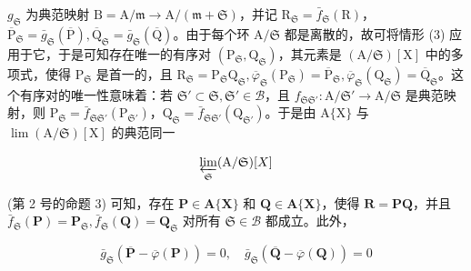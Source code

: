 \(g_{\mathfrak{S}}\) 为典范映射 \(\mathrm{B} = \mathrm{A} / \mathfrak{m}\to \mathrm{A} /(\mathfrak{m} + \mathfrak{S})\)，并记 \(\mathrm{R}_{\mathfrak{S}} = \bar{f}_{\mathfrak{S}}(\mathrm{R})\)，\(\overline{\mathrm{P}}_{\mathfrak{S}} = \bar{g}_{\mathfrak{S}}(\overline{\mathrm{P}}),\overline{\mathrm{Q}}_{\mathfrak{S}} = \bar{g}_{\mathfrak{S}}(\overline{\mathrm{Q}})\)。由于每个环 \(\mathrm{A} / \mathfrak{S}\) 都是离散的，故可将情形 (3) 应用于它，于是可知存在唯一的有序对 \((\mathrm{P}_{\mathfrak{S}},\mathrm{Q}_{\mathfrak{S}})\)，其元素是 \((\mathrm{A} / \mathfrak{S})[\mathrm{X}]\) 中的多项式，使得 \(\mathrm{P}_{\mathfrak{S}}\) 是首一的，且 \(\mathrm{R}_{\mathfrak{S}} = \mathrm{P}_{\mathfrak{S}}\mathrm{Q}_{\mathfrak{S}},\overline{\varphi}_{\mathfrak{S}}(\mathrm{P}_{\mathfrak{S}}) = \overline{\mathrm{P}}_{\mathfrak{S}},\overline{\varphi}_{\mathfrak{S}}(\mathrm{Q}_{\mathfrak{S}}) = \overline{\mathrm{Q}}_{\mathfrak{S}}\)。这个有序对的唯一性意味着：若 \(\mathfrak{S}'\subset \mathfrak{S},\mathfrak{S}'\in \mathcal{B}\)，且 \(f_{\mathfrak{S}\mathfrak{S}'}:\mathrm{A} / \mathfrak{S}'\rightarrow \mathrm{A} / \mathfrak{S}\) 是典范映射，则 \(\mathrm{P}_{\mathfrak{S}} = \bar{f}_{\mathfrak{S}\mathfrak{S}'}(\mathrm{P}_{\mathfrak{S}'})\)，\(\mathrm{Q}_{\mathfrak{S}} = \bar{f}_{\mathfrak{S}\mathfrak{S}'}(\mathrm{Q}_{\mathfrak{S}'})\)。于是由 \(\mathrm{A}\{\mathrm{X}\}\) 与 \(\lim (\mathrm{A} /\mathfrak{S})[\mathrm{X}]\) 的典范同一

\[
\varprojlim_ {\mathfrak {S}} (\mathrm{A} / \mathfrak {S}) [ X ]
\]

(第 2 号的命题 3) 可知，存在 \(\mathbf{P} \in \mathbf{A}\{\mathbf{X}\}\) 和 \(\mathbf{Q} \in \mathbf{A}\{\mathbf{X}\}\)，使得 \(\mathbf{R} = \mathbf{PQ}\)，并且 \(\bar{f}_{\mathfrak{S}}(\mathbf{P}) = \mathbf{P}_{\mathfrak{S}}, \bar{f}_{\mathfrak{S}}(\mathbf{Q}) = \mathbf{Q}_{\mathfrak{S}}\) 对所有 \(\mathfrak{S} \in \mathcal{B}\) 都成立。此外，

\[
\bar {g} _ {\mathfrak {S}} (\overline {{{\mathbf {P}}}} - \overline {{{\varphi}}} (\mathbf {P})) = 0, \quad \bar {g} _ {\mathfrak {S}} (\overline {{{\mathbf {Q}}}} - \overline {{{\varphi}}} (\mathbf {Q})) = 0
\]

